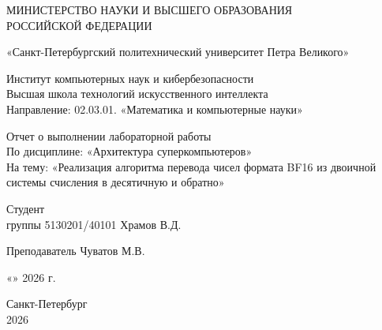 \documentclass[12pt,a4paper]{article}
\begin{document}
\begin{titlepage}
    \setcounter{page}{1}
    \thispagestyle{empty}

    \begin{center}
        { \large МИНИСТЕРСТВО НАУКИ И ВЫСШЕГО ОБРАЗОВАНИЯ \\
            РОССИЙСКОЙ ФЕДЕРАЦИИ }

        { «Санкт-Петербургский политехнический университет Петра Великого» }

        { Институт компьютерных наук и кибербезопасности \\
            Высшая школа технологий искусственного интеллекта \\
            Направление: 02.03.01. «Математика и компьютерные науки» \\ }

        \vspace{3cm}
        { \large Отчет о выполнении лабораторной работы \\
            По дисциплине: «Архитектура суперкомпьютеров» \\
            На тему: «Реализация алгоритма перевода чисел формата BF16 из двоичной системы счисления в десятичную и обратно» }

    \end{center}

    \vspace{3cm}

    \begin{center}
        \noindent
        \begin{minipage}[t]{\textwidth}
            \raggedright Студент  \\ группы 5130201/40101 \hfill
            \underline{\hspace{3cm}} Храмов В.Д.
        \end{minipage}

        \vspace{1cm}

        \noindent
        \begin{minipage}[t]{\textwidth}
            \raggedright Преподаватель \hfill
            \underline{\hspace{3cm}}  Чуватов М.В.
        \end{minipage}
    \end{center}

    \vspace{1cm}

    \begin{flushright}
        \large
        «\underline{\hspace{1cm}}» \underline{\hspace{3cm}} 2026 г.
    \end{flushright}

    \vspace{0.5cm}

    \vfill

    \begin{center}
        Санкт-Петербург \\
        2026
    \end{center}

\end{titlepage}
\end{document}
